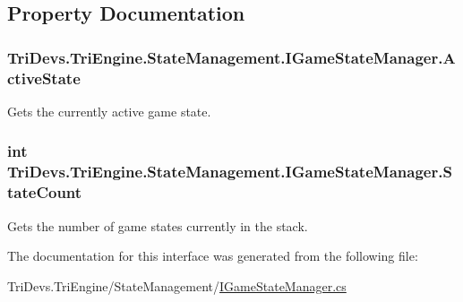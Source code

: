 \subsection{Property Documentation}
\hypertarget{interface_tri_devs_1_1_tri_engine_1_1_state_management_1_1_i_game_state_manager_a42d6a14ced07e04fe320f42f2ef9bc8b}{
\subsubsection[{Active\-State}]{ Tri\-Devs.\-Tri\-Engine.\-State\-Management.\-I\-Game\-State\-Manager.\-Active\-State\hspace{0.3cm}{\ttfamily [get]}}}\label{interface_tri_devs_1_1_tri_engine_1_1_state_management_1_1_i_game_state_manager_a42d6a14ced07e04fe320f42f2ef9bc8b}


Gets the currently active game state. 

\hypertarget{interface_tri_devs_1_1_tri_engine_1_1_state_management_1_1_i_game_state_manager_a9e3638ecf757434c6b735d3b82789665}{
\subsubsection[{State\-Count}]{\setlength{\rightskip}{0pt plus 5cm}int Tri\-Devs.\-Tri\-Engine.\-State\-Management.\-I\-Game\-State\-Manager.\-State\-Count\hspace{0.3cm}{\ttfamily [get]}}}\label{interface_tri_devs_1_1_tri_engine_1_1_state_management_1_1_i_game_state_manager_a9e3638ecf757434c6b735d3b82789665}


Gets the number of game states currently in the stack. 



The documentation for this interface was generated from the following file\-:\begin{DoxyCompactItemize}
\item 
Tri\-Devs.\-Tri\-Engine/\-State\-Management/\hyperlink{_i_game_state_manager_8cs}{I\-Game\-State\-Manager.\-cs}\end{DoxyCompactItemize}
